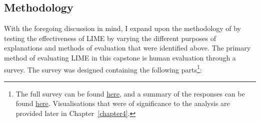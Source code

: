 \subsection{Methodology}
With the foregoing discussion in mind, I expand upon the methodology of \cite{gorski2021} by testing the effectiveness of LIME by varying the different purposes of explanations and methods of evaluation that were identified above. The primary method of evaluating LIME in this capstone is human evaluation through a survey. The survey was designed containing the following parts\footnote{The full survey can be found \href{https://github.com/TristanKoh/capstone-repo/blob/448263a933ae787027298e266f9202e7b3077524/survey/survey_questions.pdf}{here}, and a summary of the responses can be found \href{https://github.com/TristanKoh/capstone-repo/blob/448263a933ae787027298e266f9202e7b3077524/survey/survey_responses.pdf}{here}. Visualisations that were of significance to the analysis are provided later in Chapter~\ref{chapter4}.}:
